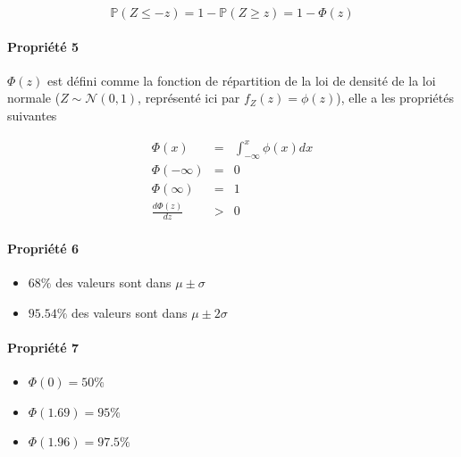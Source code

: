 \documentclass[a4paper,titlepage] {scrartcl}
\begin{document}
\begin{equation}
	\mathbb P(Z\leq -z) = 1-\mathbb P(Z\geq z) = 1 -\Phi(z)
\end{equation}

\paragraph{Propriété 5} %
\label{par:propriété_5}

$\Phi(z)$ est défini comme la fonction de répartition de la loi de densité de la loi normale ($Z\sim\mathcal N(0,1)$, représenté ici par $f_Z(z)=\phi(z)$), elle a les propriétés suivantes

\begin{eqnarray}
	\Phi(x) &=& \int_{-\infty}^x \phi(x)dx\\
	\Phi(-\infty) &=& 0\\ 
	\Phi(\infty) &=& 1\\
	\frac{d\Phi(z)}{dz}&>&0
\end{eqnarray}


\paragraph{Propriété 6} %
\label{par:propriété_6}
\begin{itemize}
	\item $68\%$ des valeurs sont dans $\mu\pm \sigma$
	\item $95.54\%$ des valeurs sont dans $\mu\pm 2\sigma$
\end{itemize}

\paragraph{Propriété 7} %
\label{par:propriété_7}
\begin{itemize}
	\item $\Phi(0) = 50\%$
	\item $\Phi(1.69) = 95\%$
	\item $\Phi(1.96)=97.5\%$
\end{itemize}
\end{document}
